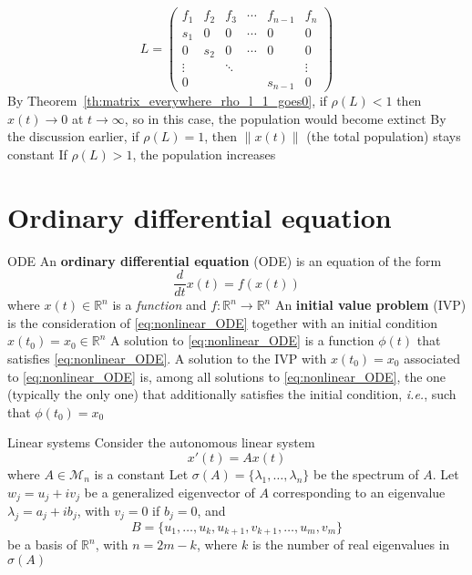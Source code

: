 \documentclass{beamer}
\def\IR{\mathbb{R}}
\def\M{\mathcal{M}}
\def\ie{\emph{i.e.}}
\def\defword#1{\textbf{#1}}
\begin{document}
\begin{frame}
\[
L= \begin{pmatrix}
f_1 & f_2 & f_3 & \cdots & f_{n-1} & f_n \\
s_1 & 0 & 0 & \cdots & 0 & 0 \\
0 & s_2 & 0 & \cdots & 0 & 0 \\
\vdots && \ddots &&& \vdots \\
0 &&&&s_{n-1} & 0
\end{pmatrix}
\]
\vfill
By Theorem~\ref{th:matrix_everywhere_rho_l_1_goes0}, if $\rho(L)<1$ then $x(t)\to 0$ at $t\to\infty$, so in this case, the population would become extinct
\vfill
By the discussion earlier, if $\rho(L)=1$, then $\|x(t)\|$ (the total population) stays constant
\vfill
If $\rho(L)>1$, the population increases
\end{frame}

\section{Ordinary differential equation}

\begin{frame}{ODE}
An \defword{ordinary differential equation} (ODE) is an equation of the form 
\begin{equation}\label{eq:nonlinear_ODE}
\dfrac{d}{dt}x(t)= f(x(t))
\end{equation}
where $x(t)\in \IR^n$ is a \emph{function} and $f:\IR^n \to \IR^n$
\vfill
An \defword{initial value problem} (IVP) is the consideration of \eqref{eq:nonlinear_ODE} together with an initial condition $x(t_0)=x_0\in\IR^n$
\vfill
A solution to \eqref{eq:nonlinear_ODE} is a function $\phi(t)$ that satisfies \eqref{eq:nonlinear_ODE}. A solution to the IVP with $x(t_0)=x_0$ associated to \eqref{eq:nonlinear_ODE} is, among all solutions to \eqref{eq:nonlinear_ODE}, the one (typically the only one) that additionally satisfies the initial condition, \ie, such that $\phi(t_0)=x_0$
\end{frame}

\begin{frame}{Linear systems}
Consider the autonomous linear system
\begin{equation}\label{eq:Lin_EDO_cc_hom}
x'(t)=Ax(t)
\end{equation}
where $A\in\M_n$ is a constant
\vfill
Let $\sigma(A)=\{\lambda_1,\ldots,\lambda_n\}$ be the spectrum of $A$.
Let $w_j=u_j+iv_j$ be a generalized eigenvector of $A$ corresponding to an eigenvalue $\lambda_j=a_j+ib_j$, with $v_j=0$ if $b_j=0$, and 
\[
B=\{u_1,\ldots,u_k,u_{k+1},v_{k+1},\ldots,u_m,v_m\}
\]
be a basis of $\mathbb{R}^n$, with $n=2m-k$, where $k$ is the number of real eigenvalues in $\sigma(A)$
\end{frame}
\end{document}
